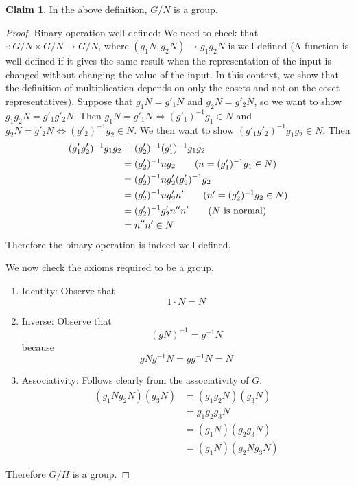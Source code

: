 \documentclass[12pt]{article}
\theoremstyle{definition}
\newtheorem{claim}{\color{JungleGreen}Claim}
\theoremstyle{definition}
\begin{document}
\begin{claim}
In the above definition, $G/N$ is a group. 
\end{claim}
\begin{proof}
Binary operation well-defined: We need to check that $\cdot: G/N \times G/N \to G/N$, where $(g_1N, g_2N) \to g_1 g_2 N$ is well-defined (A function is well-defined if it gives the same result when the representation of the input is changed without changing the value of the input. In this context, we show that the definition of multiplication depends on only the cosets and not on the coset representatives). Suppose that $g_1 N = g'_1 N$ and $g_2 N = g'_2 N$, so we want to show $g_1 g_2 N = g'_1 g'_2 N$. Then $g_1N = g'_1 N \iff (g'_1)^{-1} g_1 \in N$ and $g_2 N = g'_2 N \iff (g'_2)^{-1} g_2 \in N$. We then want to show $(g'_1g'_2)^{-1}g_1g_2 \in N$. Then
\begin{align*}
	(g'_1g'_2)^{-1}g_1g_2 &= (g'_2)^{-1} (g'_1)^{-1} g_1 g_2 \\
	&= (g'_2)^{-1} n g_2 \tag{$n = (g'_1)^{-1} g_1 \in N$} \\
	&= (g'_2)^{-1} n g'_2 (g'_2)^{-1} g_2 \\
	&= (g'_2)^{-1} n g'_2 n' \tag{$n' = (g'_2)^{-1} g_2 \in N$}\\
	&= (g'_2)^{-1} g'_2 n'' n' \tag{$N$ is normal}\\
	&= n'' n' \in N
\end{align*}
Therefore the binary operation is indeed well-defined. 

We now check the axioms required to be a group.

\begin{enumerate}
	\item Identity: Observe that
	\begin{equation}
		1 \cdot N = N
	\end{equation}

	\item Inverse: Observe that
	\begin{equation}
		(gN)^{-1} = g^{-1}N
	\end{equation}
	because 
	\begin{equation}
		gNg^{-1}N = gg^{-1} N = N
	\end{equation}

	\item Associativity: Follows clearly from the associativity of $G$. 
	\begin{align*}
		(g_1 N g_2 N)(g_3 N) &= (g_1 g_2 N)(g_3 N) \\
		&= g_1 g_2 g_3 N \\
		&= (g_1 N) (g_2 g_3 N) \\
		&= (g_1 N)(g_2 N g_3 N)
	\end{align*}
\end{enumerate}

Therefore $G/H$ is a group. 
\end{proof}
\end{document}
